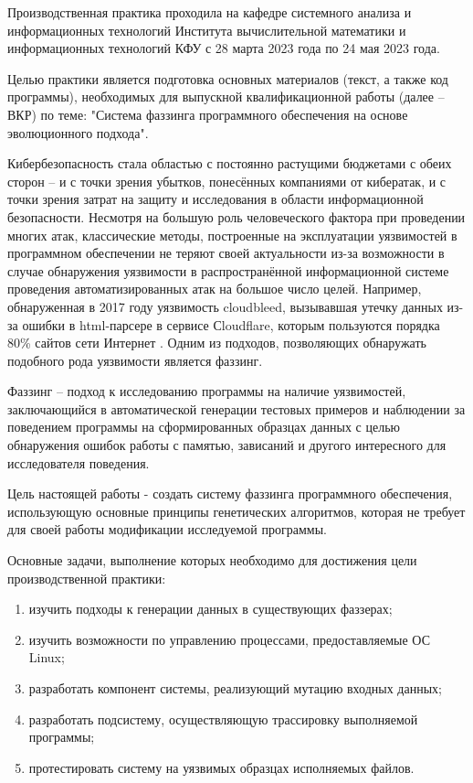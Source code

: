 \label{sec:intro}

Производственная практика проходила на кафедре системного анализа
и информационных технологий Института вычислительной математики и
информационных технологий КФУ с 28 марта 2023 года по 24 мая 2023 года.

Целью практики является подготовка основных материалов (текст, а
также код программы), необходимых для выпускной квалификационной
работы (далее -- ВКР) по теме: "Система фаззинга программного обеспечения на основе эволюционного подхода".

Кибербезопасность стала областью с постоянно растущими бюджетами с обеих сторон -- и с точки зрения убытков, понесённых компаниями от кибератак, и с точки зрения затрат на защиту и исследования в области информационной безопасности. Несмотря на большую роль человеческого фактора при проведении многих атак, классические методы, построенные на эксплуатации уязвимостей в программном обеспечении не теряют своей актуальности из-за возможности в случае обнаружения уязвимости в распространённой информационной системе проведения автоматизированных атак на большое число целей. Например, обнаруженная в 2017 году уязвимость cloudbleed, вызывавшая утечку данных из-за ошибки в html-парсере в сервисе Сloudflare, которым пользуются порядка 80\% сайтов сети Интернет \cite{cloudbleed}. Одним из подходов, позволяющих обнаружать подобного рода уязвимости является фаззинг.

Фаззинг -- подход к исследованию программы на наличие уязвимостей, заключающийся в автоматической генерации тестовых примеров и наблюдении за поведением программы на сформированных образцах данных с целью обнаружения ошибок работы с памятью, зависаний и другого интересного для исследователя поведения.

Цель настоящей работы - создать систему фаззинга программного обеспечения, использующую основные принципы генетических алгоритмов, которая не требует для своей работы модификации исследуемой программы.

Основные задачи, выполнение которых необходимо для достижения цели производственной практики:

\begin{enumerate}
	\item изучить подходы к генерации данных в существующих фаззерах;
	
	\item изучить возможности по управлению процессами, предоставляемые ОС Linux;
	
	\item разработать компонент системы, реализующий мутацию входных данных;
	
	\item разработать подсистему, осуществляющую трассировку выполняемой программы;
	
	\item протестировать систему на уязвимых образцах исполняемых файлов.
\end{enumerate}